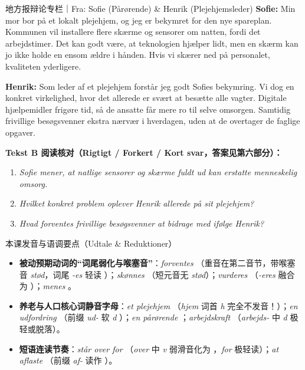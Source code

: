 \begin{emailbox}{地方报辩论专栏｜Fra: Sofie (Pårørende) \& Henrik (Plejehjemsleder)}
\textbf{Sofie:} Min mor bor på et lokalt plejehjem, og jeg er bekymret for den nye spareplan. Kommunen vil installere flere skærme og sensorer om natten, fordi det  arbejdstimer. Det kan godt være, at teknologien hjælper lidt, men en skærm kan jo ikke holde en ensom ældre i hånden. Hvis vi skærer ned på personalet,  kvaliteten  yderligere.

\textbf{Henrik:} Som leder af et plejehjem forstår jeg godt Sofies bekymring. Vi  dog  en konkret virkelighed, hvor det allerede er svært at besætte alle vagter. Digitale hjælpemidler  frigøre tid, så de ansatte får mere ro til selve omsorgen. Samtidig  frivillige besøgsvenner  ekstra nærvær i hverdagen, uden at de overtager de faglige opgaver.
\end{emailbox}

\textbf{Tekst B 阅读核对（Rigtigt / Forkert / Kort svar，答案见第六部分）：}
\begin{enumerate}
  \item \textit{Sofie mener, at natlige sensorer og skærme fuldt ud kan erstatte menneskelig omsorg.} \underline{\hspace{2.2cm}}
  \item \textit{Hvilket konkret problem oplever Henrik allerede på sit plejehjem?} \underline{\hspace{4.5cm}}
  \item \textit{Hvad forventes frivillige besøgsvenner at bidrage med ifølge Henrik?} \underline{\hspace{4.5cm}}
\end{enumerate}

\begin{tipbox}{本课发音与语调要点（Udtale \& Reduktioner）}
\begin{itemize}
  \item \textbf{被动预期动词的“词尾弱化与喉塞音”}：\textit{forventes} （重音在第二音节，带喉塞音 \textit{stød}，词尾 \textit{-es} 轻读 ）；\textit{skønnes} （短元音无 \textit{stød}）；\textit{vurderes} （\textit{-eres} 融合为 ）；\textit{menes} 。
  \item \textbf{养老与人口核心词静音字母}：\textit{et plejehjem} （\textit{hjem} 词首 \textit{h} 完全不发音！）；\textit{en udfordring} （前缀 \textit{ud-} 软 \textit{d} ）；\textit{en pårørende} ；\textit{arbejdskraft} （\textit{arbejds-} 中 \textit{d} 极轻或脱落）。
  \item \textbf{短语连读节奏}：\textit{står over for} （\textit{over} 中 \textit{v} 弱滑音化为 ，\textit{for} 极轻读）；\textit{at aflaste} （前缀 \textit{af-} 读作 ）。
\end{itemize}
\end{tipbox}


